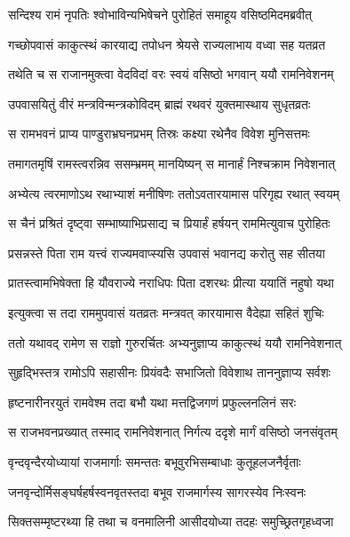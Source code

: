
\twolineshloka
{सन्दिश्य रामं नृपतिः श्वोभाविन्यभिषेचने}
{पुरोहितं समाहूय वसिष्ठमिदमब्रवीत्} %

\twolineshloka
{गच्छोपवासं काकुत्स्थं कारयाद्य तपोधन}
{श्रेयसे राज्यलाभाय वध्वा सह यतव्रत} %

\twolineshloka
{तथेति च स राजानमुक्त्वा वेदविदां वरः}
{स्वयं वसिष्ठो भगवान् ययौ रामनिवेशनम्} %

\twolineshloka
{उपवासयितुं वीरं मन्त्रविन्मन्त्रकोविदम्}
{ब्राह्मं रथवरं युक्तमास्थाय सुधृतव्रतः} %

\twolineshloka
{स रामभवनं प्राप्य पाण्डुराभ्रघनप्रभम्}
{तिस्रः कक्ष्या रथेनैव विवेश मुनिसत्तमः} %

\twolineshloka
{तमागतमृषिं रामस्त्वरन्निव ससम्भ्रमम्}
{मानयिष्यन् स मानार्हं निश्चक्राम निवेशनात्} %

\twolineshloka
{अभ्येत्य त्वरमाणोऽथ रथाभ्याशं मनीषिणः}
{ततोऽवतारयामास परिगृह्य रथात् स्वयम्} %

\twolineshloka
{स चैनं प्रश्रितं दृष्ट्वा सम्भाष्याभिप्रसाद्य च}
{प्रियार्हं हर्षयन् राममित्युवाच पुरोहितः} %

\twolineshloka
{प्रसन्नस्ते पिता राम यत्त्वं राज्यमवाप्स्यसि}
{उपवासं भवानद्य करोतु सह सीतया} %

\twolineshloka
{प्रातस्त्वामभिषेक्ता हि यौवराज्ये नराधिपः}
{पिता दशरथः प्रीत्या ययातिं नहुषो यथा} %

\twolineshloka
{इत्युक्त्वा स तदा राममुपवासं यतव्रतः}
{मन्त्रवत् कारयामास वैदेह्या सहितं शुचिः} %

\twolineshloka
{ततो यथावद् रामेण स राज्ञो गुरुरर्चितः}
{अभ्यनुज्ञाप्य काकुत्स्थं ययौ रामनिवेशनात्} %

\twolineshloka
{सुहृद्भिस्तत्र रामोऽपि सहासीनः प्रियंवदैः}
{सभाजितो विवेशाथ ताननुज्ञाप्य सर्वशः} %

\twolineshloka
{हृष्टनारीनरयुतं रामवेश्म तदा बभौ}
{यथा मत्तद्विजगणं प्रफुल्लनलिनं सरः} %

\twolineshloka
{स राजभवनप्रख्यात् तस्माद् रामनिवेशनात्}
{निर्गत्य ददृशे मार्गं वसिष्ठो जनसंवृतम्} %

\twolineshloka
{वृन्दवृन्दैरयोध्यायां राजमार्गाः समन्ततः}
{बभूवुरभिसम्बाधाः कुतूहलजनैर्वृताः} %

\twolineshloka
{जनवृन्दोर्मिसङ्घर्षहर्षस्वनवृतस्तदा}
{बभूव राजमार्गस्य सागरस्येव निःस्वनः} %

\twolineshloka
{सिक्तसम्मृष्टरथ्या हि तथा च वनमालिनी}
{आसीदयोध्या तदहः समुच्छ्रितगृहध्वजा} %


